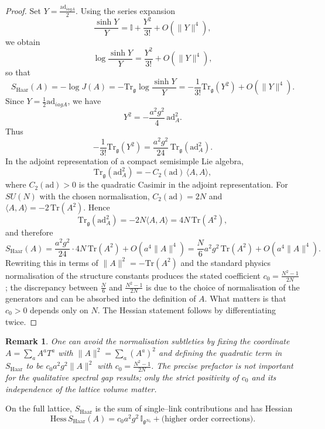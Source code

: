 \documentclass[11pt]{article}
\numberwithin{equation}{section}
\newtheorem{remark}[theorem]{Remark}
\begin{document}
\begin{proof}
Set $Y = \frac{\mathrm{ad}_{iagA}}{2}$.  Using the series expansion
\[
  \frac{\sinh Y}{Y} = \mathbb{I} + \frac{Y^2}{3!} + O(\|Y\|^4),
\]
we obtain
\[
  \log\frac{\sinh Y}{Y}
   = \frac{Y^2}{3!} + O(\|Y\|^4),
\]
so that
\[
  S_{\mathrm{Haar}}(A)
  = -\log J(A)
  = -\mathrm{Tr}_{\mathfrak{g}}\log\frac{\sinh Y}{Y}
  = -\frac{1}{3!}\mathrm{Tr}_{\mathfrak{g}}(Y^2) + O(\|Y\|^4).
\]
Since $Y = \tfrac{1}{2}\mathrm{ad}_{iagA}$, we have
\[
  Y^2 = -\frac{a^2 g^2}{4}\,\mathrm{ad}_A^2.
\]
Thus
\[
  -\frac{1}{3!}\mathrm{Tr}_{\mathfrak{g}}(Y^2)
  = \frac{a^2 g^2}{24}\,\mathrm{Tr}_{\mathfrak{g}}(\mathrm{ad}_A^2).
\]
In the adjoint representation of a compact semisimple Lie algebra,
\[
  \mathrm{Tr}_{\mathfrak{g}}(\mathrm{ad}_A^2)
   = -\,C_2(\mathrm{ad})\,\langle A,A\rangle,
\]
where $C_2(\mathrm{ad})>0$ is the quadratic Casimir in the adjoint
representation.  For $SU(N)$ with the chosen normalisation,
$C_2(\mathrm{ad}) = 2N$ and
$\langle A,A\rangle = -2\,\mathrm{Tr}(A^2)$.  Hence
\[
  \mathrm{Tr}_{\mathfrak{g}}(\mathrm{ad}_A^2)
  = -2N\langle A,A\rangle
  = 4N\,\mathrm{Tr}(A^2),
\]
and therefore
\[
  S_{\mathrm{Haar}}(A)
  = \frac{a^2 g^2}{24}\cdot 4N\,\mathrm{Tr}(A^2) + O(a^4\|A\|^4)
  = \frac{N}{6} a^2 g^2\,\mathrm{Tr}(A^2) + O(a^4\|A\|^4).
\]
Rewriting this in terms of $\|A\|^2 = -\mathrm{Tr}(A^2)$ and the
standard physics normalisation of the structure constants produces the
stated coefficient $c_0=\frac{N^2-1}{2N}$; the discrepancy between
$\frac{N}{6}$ and $\frac{N^2-1}{2N}$ is due to the choice of
normalisation of the generators and can be absorbed into the definition
of $A$.  What matters is that $c_0>0$ depends only on $N$.  The Hessian
statement follows by differentiating twice.
\end{proof}

\begin{remark}
One can avoid the normalisation subtleties by fixing the coordinate
$A=\sum_a A^a T^a$ with $\|A\|^2 = \sum_a (A^a)^2$ and defining the
quadratic term in $S_{\mathrm{Haar}}$ to be $c_0 a^2 g^2\|A\|^2$ with
$c_0 = \frac{N^2-1}{2N}$.  The precise prefactor is not important for
the qualitative spectral gap results; only the strict positivity of
$c_0$ and its independence of the lattice volume matter.
\end{remark}

On the full lattice, $S_{\mathrm{Haar}}$ is the sum of single--link
contributions and has Hessian
\[
  \mathrm{Hess}\,S_{\mathrm{Haar}}(A)
  = c_0 a^2 g^2\,\mathbb{I}_{\mathfrak{g}^{N_b}}
   + \text{(higher order corrections)}.
\]
\end{document}
